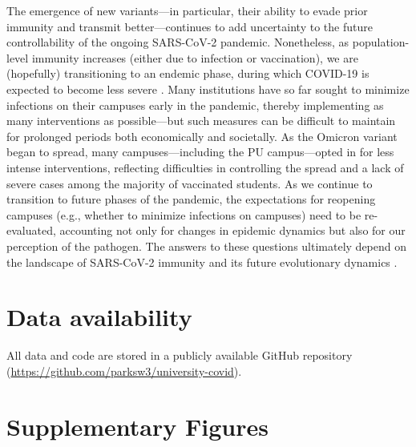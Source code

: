 \documentclass[12pt]{article}
\begin{document}
The emergence of new variants---in particular, their ability to evade prior immunity and transmit better---continues to add uncertainty to the future controllability of the ongoing SARS-CoV-2 pandemic.
Nonetheless, as population-level immunity increases (either due to infection or vaccination), we are (hopefully) transitioning to an endemic phase, during which COVID-19 is expected to become less severe \citep{lavine2021immunological}.
Many institutions have so far sought to minimize infections on their campuses early in the pandemic, thereby implementing as many interventions as possible---but such measures can be difficult to maintain for prolonged periods both economically and societally.
As the Omicron variant began to spread, many campuses---including the PU campus---opted in for less intense interventions, reflecting difficulties in controlling the spread and a lack of severe cases among the majority of vaccinated students.
As we continue to transition to future phases of the pandemic, the expectations for reopening campuses (e.g., whether to minimize infections on campuses) need to be re-evaluated, accounting not only for changes in epidemic dynamics but also for our perception of the pathogen.
The answers to these questions ultimately depend on the landscape of SARS-CoV-2 immunity and its future evolutionary dynamics \citep{saad2020immune,baker2021limits}.

\section*{Data availability}

All data and code are stored in a publicly available GitHub repository (\url{https://github.com/parksw3/university-covid}).



\pagebreak

\section*{Supplementary Figures}

\renewcommand{\thefigure}{S\arabic{figure}}
\setcounter{figure}{0}
\end{document}
